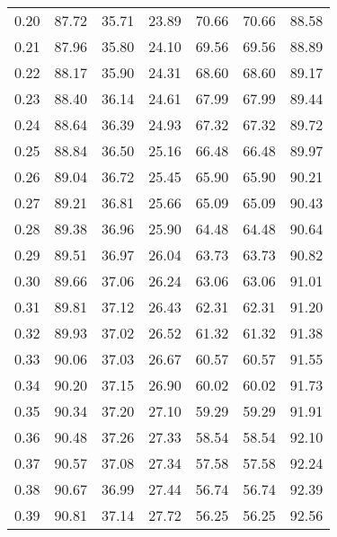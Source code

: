 \begin{tabular}{|c|c|c|c|c|c|c|}
      0.20 &     87.72 &     35.71 &      23.89 &   70.66 &      70.66 &         88.58 \\
      0.21 &     87.96 &     35.80 &      24.10 &   69.56 &      69.56 &         88.89 \\
      0.22 &     88.17 &     35.90 &      24.31 &   68.60 &      68.60 &         89.17 \\
      0.23 &     88.40 &     36.14 &      24.61 &   67.99 &      67.99 &         89.44 \\
      0.24 &     88.64 &     36.39 &      24.93 &   67.32 &      67.32 &         89.72 \\
      0.25 &     88.84 &     36.50 &      25.16 &   66.48 &      66.48 &         89.97 \\
      0.26 &     89.04 &     36.72 &      25.45 &   65.90 &      65.90 &         90.21 \\
      0.27 &     89.21 &     36.81 &      25.66 &   65.09 &      65.09 &         90.43 \\
      0.28 &     89.38 &     36.96 &      25.90 &   64.48 &      64.48 &         90.64 \\
      0.29 &     89.51 &     36.97 &      26.04 &   63.73 &      63.73 &         90.82 \\
      0.30 &     89.66 &     37.06 &      26.24 &   63.06 &      63.06 &         91.01 \\
      0.31 &     89.81 &     37.12 &      26.43 &   62.31 &      62.31 &         91.20 \\
      0.32 &     89.93 &     37.02 &      26.52 &   61.32 &      61.32 &         91.38 \\
      0.33 &     90.06 &     37.03 &      26.67 &   60.57 &      60.57 &         91.55 \\
      0.34 &     90.20 &     37.15 &      26.90 &   60.02 &      60.02 &         91.73 \\
      0.35 &     90.34 &     37.20 &      27.10 &   59.29 &      59.29 &         91.91 \\
      0.36 &     90.48 &     37.26 &      27.33 &   58.54 &      58.54 &         92.10 \\
      0.37 &     90.57 &     37.08 &      27.34 &   57.58 &      57.58 &         92.24 \\
      0.38 &     90.67 &     36.99 &      27.44 &   56.74 &      56.74 &         92.39 \\
      0.39 &     90.81 &     37.14 &      27.72 &   56.25 &      56.25 &         92.56 \\

\end{tabular}
